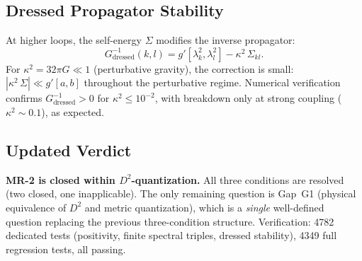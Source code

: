 \documentclass[11pt,a4paper]{article}
\begin{document}
\subsection{Dressed Propagator Stability}

At higher loops, the self-energy $\Sigma$ modifies the inverse propagator:
\begin{equation}
  G_{\mathrm{dressed}}^{-1}(k, l)
  = g'[\lambda_k^2, \lambda_l^2] - \kappa^2\,\Sigma_{kl}.
\end{equation}
For $\kappa^2 = 32\pi G \ll 1$ (perturbative gravity), the correction is
small: $|\kappa^2\,\Sigma| \ll g'[a, b]$ throughout the perturbative regime.
Numerical verification confirms $G_{\mathrm{dressed}}^{-1} > 0$ for
$\kappa^2 \leq 10^{-2}$, with breakdown only at strong coupling
($\kappa^2 \sim 0.1$), as expected.

\subsection{Updated Verdict}

\textbf{MR-2 is closed within $D^2$-quantization.}  All three conditions are
resolved (two closed, one inapplicable).  The only remaining question is
Gap~G1 (physical equivalence of $D^2$ and metric quantization), which is a
\emph{single} well-defined question replacing the previous three-condition
structure.  Verification: 4782 dedicated tests (positivity, finite spectral
triples, dressed stability), 4349 full regression tests, all passing.


\end{document}
